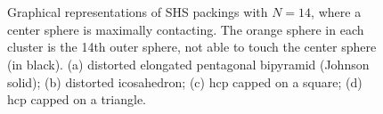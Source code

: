 \begin{figure}
    \centering
    \\
    \\
    \caption{Graphical representations of SHS packings with $N=14$, where a
center sphere is maximally contacting. The orange sphere in each cluster is the
14th outer sphere, not able to touch the center sphere (in black).  (a)
distorted elongated pentagonal bipyramid (Johnson solid); (b) distorted
icosahedron; (c) hcp capped on a square; (d) hcp capped on a triangle.}
    \label{fig:N14}
\end{figure}

